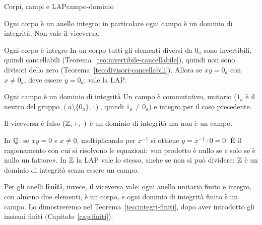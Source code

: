 \begin{concetto}
\begin{Proposizione}{Corpi, campi e LAP}{campo-dominio}
    \begin{prerequisiti}
    \end{prerequisiti}
    Ogni corpo è un anello integro; in particolare ogni campo è un dominio di integrità. Non vale il viceversa.
\end{Proposizione}
\begin{dimostrazione}
    \begin{caso}{Ogni corpo è integro}
        In un corpo tutti gli elementi diversi da $0_a$ sono invertibili, quindi cancellabili (Teorema~\ref{teo:invertibile-cancellabile}),
        quindi non sono divisori dello zero (Teorema~\ref{teo:divisori-cancellabili}). Allora se $xy = 0_a$ con $x \neq 0_a$, deve essere $y = 0_a$: vale la LAP.
    \end{caso}
    \begin{caso}{Ogni campo è un dominio di integrità}
        Un campo è commutativo, unitario ($1_a$ è il neutro del gruppo $(a \setminus \{0_a\}, \cdot)$, quindi $1_a \neq 0_a$) e integro per il caso precedente.
    \end{caso}
    \begin{caso}{Il viceversa è falso}
        $(\mathbb{Z}, +, \cdot)$ è un dominio di integrità ma non è un campo.
    \end{caso}
\end{dimostrazione}
\end{concetto}

\begin{spiegazione}
    In $\mathbb{Q}$: se $xy = 0$ e $x \neq 0$, moltiplicando per $x^{-1}$ si ottiene $y = x^{-1} \cdot 0 = 0$. È il ragionamento con cui si risolvono le equazioni: «un prodotto
    è nullo se e solo se è nullo un fattore». In $\mathbb{Z}$ la LAP vale lo stesso, anche se non si può dividere: $\mathbb{Z}$ è un dominio di integrità senza essere un campo.
\end{spiegazione}


Per gli anelli \textbf{finiti}, invece, il viceversa vale: ogni anello unitario finito e integro, con almeno due elementi, è
un corpo, e ogni dominio di integrità finito è un campo. Lo dimostreremo nel Teorema~\ref{teo:integri-finiti}, dopo aver
introdotto gli insiemi finiti (Capitolo~\ref{cap:finiti}).

